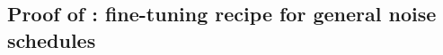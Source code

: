 
\subsection{Proof of : fine-tuning recipe for general noise schedules} \label{subsec:proof_prop_diff_finetuning}

